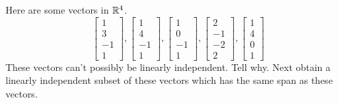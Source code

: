 \documentclass{ximera}
\begin{document}
\begin{problem}\label{prb:3.31} Here are some vectors in $\mathbb{R}^{4}$.
\begin{equation*}
\left[
\begin{array}{r}
1 \\
3 \\
-1 \\
1
\end{array}
\right] ,\left[
\begin{array}{r}
1 \\
4 \\
-1 \\
1
\end{array}
\right] ,\left[
\begin{array}{r}
1 \\
0 \\
-1 \\
1
\end{array}
\right] ,\left[
\begin{array}{r}
2 \\
-1 \\
-2 \\
2
\end{array}
\right] ,\left[
\begin{array}{r}
1 \\
4 \\
0 \\
1
\end{array}
\right]
\end{equation*}
These vectors can't possibly be linearly independent. Tell why. Next obtain a
linearly independent subset of these vectors which has the same span as
these vectors. 
\end{problem}
\end{document}
